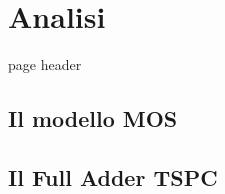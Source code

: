 
\chapter{Analisi} %
\label{Chapter2} page header

\section{Il modello MOS}
\label{sec:mos}

\section{Il Full Adder TSPC}
\label{sec:fullAdder}





